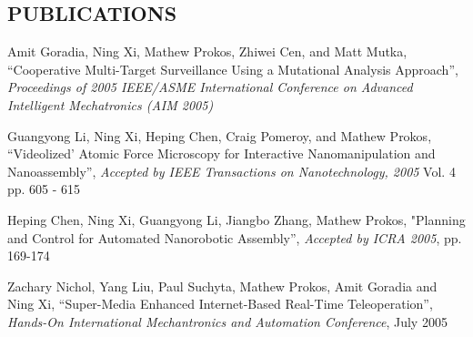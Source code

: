 \documentclass[line]{res}
\begin{document}
\begin{resume}
\section{PUBLICATIONS} 
\vspace{1mm}
   Amit Goradia, Ning Xi, Mathew Prokos, Zhiwei Cen, and Matt Mutka,
   ``Cooperative Multi-Target Surveillance Using a Mutational Analysis Approach'',
   \textsl{Proceedings of 2005 IEEE/ASME International Conference on
      Advanced Intelligent Mechatronics (AIM 2005)}

   \vspace{-2mm}
   Guangyong Li, Ning Xi, Heping Chen, Craig Pomeroy, and Mathew Prokos,
   ``Videolized' Atomic Force Microscopy for Interactive Nanomanipulation and Nanoassembly'',
   \textsl{Accepted by IEEE Transactions on Nanotechnology, 2005} Vol. 4 pp. 605 - 615

   \vspace{-2mm}
   Heping Chen, Ning Xi, Guangyong Li, Jiangbo Zhang, Mathew Prokos,
   "Planning and Control for Automated Nanorobotic Assembly'',
   \textsl{Accepted by ICRA 2005}, pp. 169-174

   \vspace{-2mm}
   Zachary Nichol, Yang Liu, Paul Suchyta, Mathew Prokos, Amit Goradia and Ning Xi, 
   ``Super-Media Enhanced Internet-Based Real-Time Teleoperation'',
   \textsl{Hands-On International Mechantronics and Automation Conference}, July 2005
\end{resume}
\end{document}
